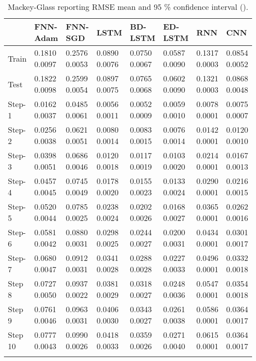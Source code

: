 \documentclass{ieeeaccess}
\begin{document}
\begin{table*}[htbp]
\smaller 
\caption{Mackey-Glass reporting RMSE mean and 95 \% confidence interval   ().}
\label{tab:mackey}
\begin{tabular}{llllllll}
\hline
 &  FNN-Adam& FNN-SGD & LSTM & BD-LSTM  & ED-LSTM & RNN & CNN\\
				
\hline
\hline
Train &      
0.1810	0.0097&
0.2576	0.0053&
0.0890	0.0076&
0.0750	0.0067&
0.0587	0.0090&
0.1317	0.0003& 0.0854		0.0052\\
Test &      
0.1822	0.0098&
0.2599	0.0054&
0.0897	0.0075&
0.0765	0.0068&
0.0602	0.0090&
0.1321	0.0003&0.0868		0.0048\\
Step-1 &      
0.0162	0.0037&
0.0485	0.0061&
0.0056	0.0011&
0.0052	0.0009&
0.0059	0.0010&
0.0078	0.0001&	0.0075		0.0007\\
Step-2 &      
0.0256	0.0038&
0.0621	0.0051&
0.0080	0.0014&
0.0083	0.0015&
0.0076	0.0014&
0.0142	0.0001&0.0120		0.0010\\
Step-3 &      
0.0398	0.0051&
0.0686	0.0046&
0.0120	0.0018&
0.0117	0.0019&
0.0103	0.0020&
0.0214	0.0001&	0.0167		0.0013\\
Step-4 &      
0.0457	0.0045&
0.0745	0.0049&
0.0178	0.0020&
0.0155	0.0023&
0.0133	0.0024&
0.0290	0.0001&0.0216		0.0015\\
Step-5 &      
0.0520	0.0044&
0.0785	0.0025&
0.0238	0.0024&
0.0202	0.0026&
0.0168	0.0027&
0.0365	0.0001&	0.0262		0.0016\\
Step-6 &      
0.0581	0.0042&
0.0880	0.0031&
0.0298	0.0025&
0.0244	0.0027&
0.0200	0.0031&
0.0434	0.0001&0.0301		0.0017\\
Step-7 &      
0.0680	0.0047&
0.0912	0.0031&
0.0341	0.0028&
0.0288	0.0028&
0.0227	0.0033&
0.0496	0.0001&	0.0332		0.0018\\
Step 8 &      
0.0727	0.0050&
0.0937	0.0022&
0.0381	0.0029&
0.0318	0.0027&
0.0248	0.0036&
0.0547	0.0001&	0.0354		0.0018\\
Step 9 &      
0.0761	0.0046&
0.0963	0.0031&
0.0406	0.0030&
0.0343	0.0027&
0.0261	0.0038&
0.0586	0.0001&	0.0364		0.0017\\
Step 10 &      
0.0777	0.0043&
0.0990	0.0026&
0.0418	0.0033&
0.0359	0.0026&
0.0271	0.0040&
0.0615	0.0001&	0.0364		0.0017\\
\hline
 &
\end{tabular}

\end{table*}
\end{document}
